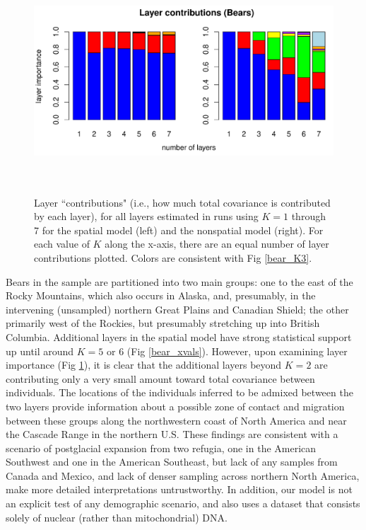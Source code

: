 \documentclass[12pt]{article}
\begin{document}
\begin{figure}
	\centering
		{\includegraphics[width=6in,height=3in]{figs/bears/bears_laycon_barplots.pdf}}
	\caption{
	Layer ``contributions" (i.e., how much total covariance is contributed by each layer), 
	for all layers estimated in runs using $K = 1$ through 7 
	for the spatial model (left) and the nonspatial model (right).
	For each value of $K$ along the x-axis, there are an equal number of layer contributions plotted.
	Colors are consistent with Fig \ref{bear_K3}.
    }\label{bear_laycon}
\end{figure}

Bears in the sample are partitioned into two main groups:
one to the east of the Rocky Mountains, 
which also occurs in Alaska, and, presumably, 
in the intervening (unsampled) northern Great Plains and Canadian Shield;
the other primarily west of the Rockies, 
but presumably stretching up into British Columbia.
Additional layers in the spatial model have strong statistical support 
up until around $K=5$ or 6 (Fig \ref{bear_xvals}).
However, upon examining layer importance (Fig \ref{bear_laycon}),
it is clear that the additional layers beyond $K=2$ are contributing only a very small amount toward 
total covariance between individuals.
The locations of the individuals inferred to be admixed between the two layers 
provide information about a possible zone of contact and migration between these groups 
along the northwestern coast of North America and near the Cascade Range in the northern U.S.
These findings are consistent with a scenario of postglacial expansion from two refugia, 
one in the American Southwest and one in the American Southeast, 
but lack of any samples from Canada and Mexico, 
and lack of denser sampling across northern North America, 
make more detailed interpretations untrustworthy.
In addition, our model is not an explicit test of any demographic scenario, 
and also uses a dataset that consists solely of nuclear (rather than mitochondrial) DNA.
\end{document}

